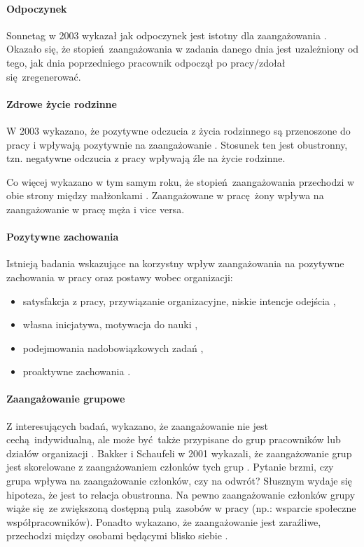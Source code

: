 \paragraph{Odpoczynek}
Sonnetag w 2003 wykazał jak odpoczynek jest istotny dla zaangażowania \cite{sonnentag2003recovery}. Okazało się, że stopień zaangażowania w zadania danego dnia jest uzależniony od tego, jak dnia poprzedniego pracownik odpoczął po pracy/zdołał się zregenerować.
\paragraph{Zdrowe życie rodzinne}
W 2003 wykazano, że pozytywne odczucia z życia rodzinnego są przenoszone do pracy i wpływają pozytywnie na zaangażowanie \cite{montgomery2003work}. Stosunek ten jest obustronny, tzn. negatywne odczucia z pracy wpływają źle na życie rodzinne. 

Co więcej wykazano w tym samym roku, że stopień zaangażowania przechodzi w obie strony między małżonkami \cite{bakker2003crossover}. Zaangażowane w pracę żony wpływa na zaangażowanie w pracę męża i vice versa.
\paragraph{Pozytywne zachowania}
Istnieją badania wskazujące na korzystny wpływ zaangażowania na pozytywne zachowania w pracy oraz postawy wobec organizacji:
\begin{itemize}
  \item satysfakcja z pracy, przywiązanie organizacyjne, niskie intencje odejścia \cite{demerouti2001job,salanova2000burnout,schaufeli2008workaholism},
  \item własna inicjatywa, motywacja do nauki \cite{sonnentag2003recovery},
  \item podejmowania nadobowiązkowych zadań \cite{salanova2005linking},
  \item proaktywne zachowania \cite{salanova2003perceived}.
\end{itemize}
\paragraph{Zaangażowanie grupowe}
Z interesujących badań, wykazano, że zaangażowanie nie jest cechą indywidualną, ale może być także przypisane do grup pracowników lub działów organizacji \cite{salanova2005linking,bakker2003multigroup}. Bakker i Schaufeli w 2001 wykazali, że zaangażowanie grup jest skorelowane z zaangażowaniem członków tych grup \cite{bakker2001burnout}. Pytanie brzmi, czy grupa wpływa na zaangażowanie członków, czy na odwrót? Słusznym wydaje się hipoteza, że jest to relacja
obustronna. Na pewno zaangażowanie członków grupy wiąże się ze zwiększoną dostępną pulą zasobów w pracy (np.: wsparcie społeczne współpracowników). Ponadto wykazano, że zaangażowanie jest zaraźliwe, przechodzi między osobami będącymi blisko siebie \cite{bakker2003crossover}.

